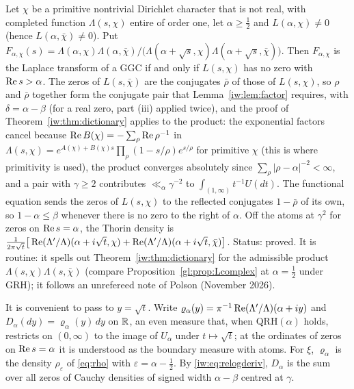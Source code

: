 \begin{remark}\label{iw:rem:complexchar}
Let $\chi$ be a primitive nontrivial Dirichlet character that is not real, with completed function $\Lambda(s,\chi)$ entire of order one, let $\alpha\ge\frac12$ and $L(\alpha,\chi)\ne0$ (hence $L(\alpha,\bar\chi)\ne0$). Put $F_{\alpha,\chi}(s)=\Lambda(\alpha,\chi)\Lambda(\alpha,\bar\chi)/\big(\Lambda(\alpha+\sqrt s,\chi)\Lambda(\alpha+\sqrt s,\bar\chi)\big)$. Then $F_{\alpha,\chi}$ is the Laplace transform of a GGC if and only if $L(s,\chi)$ has no zero with $\operatorname{Re} s>\alpha$. The zeros of $L(s,\bar\chi)$ are the conjugates $\bar\rho$ of those of $L(s,\chi)$, so $\rho$ and $\bar\rho$ together form the conjugate pair that Lemma~\ref{iw:lem:factor} requires, with $\delta=\alpha-\beta$ (for a real zero, part (iii) applied twice), and the proof of Theorem~\ref{iw:thm:dictionary} applies to the product: the exponential factors cancel because $\operatorname{Re} B(\chi)=-\sum_\rho\operatorname{Re}\rho^{-1}$ in $\Lambda(s,\chi)=e^{A(\chi)+B(\chi)s}\prod_\rho(1-s/\rho)e^{s/\rho}$ for primitive $\chi$ \cite[Ch.~12]{Davenport} (this is where primitivity is used), the product converges absolutely since $\sum_\rho|\rho-\alpha|^{-2}<\infty$, and a pair with $\gamma\ge2$ contributes $\ll_\alpha\gamma^{-2}$ to $\int_{(1,\infty)}t^{-1}U(dt)$. The functional equation sends the zeros of $L(s,\chi)$ to the reflected conjugates $1-\bar\rho$ of its own, so $1-\alpha\le\beta$ whenever there is no zero to the right of $\alpha$. Off the atoms at $\gamma^2$ for zeros on $\operatorname{Re} s=\alpha$, the Thorin density is $\frac1{2\pi\sqrt t}\big[\operatorname{Re}(\Lambda'/\Lambda)(\alpha+i\sqrt t,\chi)+\operatorname{Re}(\Lambda'/\Lambda)(\alpha+i\sqrt t,\bar\chi)\big]$. Status: proved. It is routine: it spells out Theorem~\ref{iw:thm:dictionary} for the admissible product $\Lambda(s,\chi)\Lambda(s,\bar\chi)$ (compare Proposition~\ref{gl:prop:Lcomplex} at $\alpha=\frac12$ under GRH); it follows an unrefereed note of Polson (November 2026).
\end{remark}

It is convenient to pass to $y=\sqrt t$. Write $\varrho_\alpha(y)=\pi^{-1}\operatorname{Re}(\Lambda'/\Lambda)(\alpha+iy)$ and $D_\alpha(dy)=\varrho_\alpha(y)\,dy$ on $\mathbb{R}$, an even measure that, when $\mathrm{QRH}(\alpha)$ holds, restricts on $(0,\infty)$ to the image of $U_\alpha$ under $t\mapsto\sqrt t$; at the ordinates of zeros on $\operatorname{Re} s=\alpha$ it is understood as the boundary measure with atoms. For $\xi$, $\varrho_\alpha$ is the density $\rho_\varepsilon$ of \eqref{eq:rho} with $\varepsilon=\alpha-\frac12$. By \eqref{iw:eq:relogderiv}, $D_\alpha$ is the sum over all zeros of Cauchy densities of signed width $\alpha-\beta$ centred at $\gamma$.


